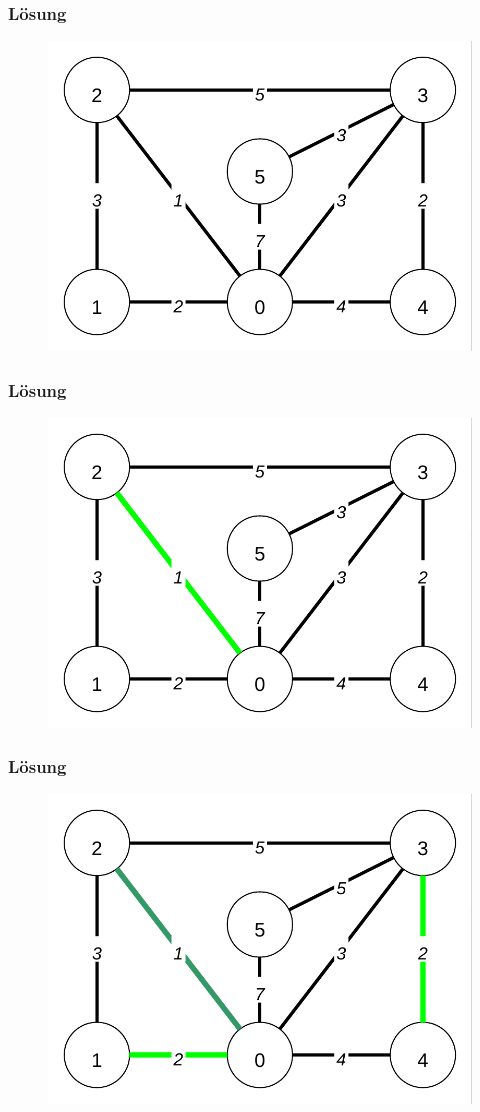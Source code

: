 \begin{frame}
\frametitle{Lösung}
\begin{figure}
\includegraphics[width=0.75\linewidth, trim = 2mm 2mm 2mm 2mm, clip = true]{kruskal_graphs/graph1.pdf}
\end{figure}
\end{frame}

\begin{frame}
\frametitle{Lösung}
\begin{figure}
\includegraphics[width=0.75\linewidth, trim = 2mm 2mm 2mm 2mm, clip = true]{kruskal_graphs/graph2.pdf}
\end{figure}
\end{frame}

\begin{frame}
\frametitle{Lösung}
\begin{figure}
\includegraphics[width=0.75\linewidth, trim = 2mm 2mm 2mm 2mm, clip = true]{kruskal_graphs/graph3.pdf}
\end{figure}
\end{frame}

